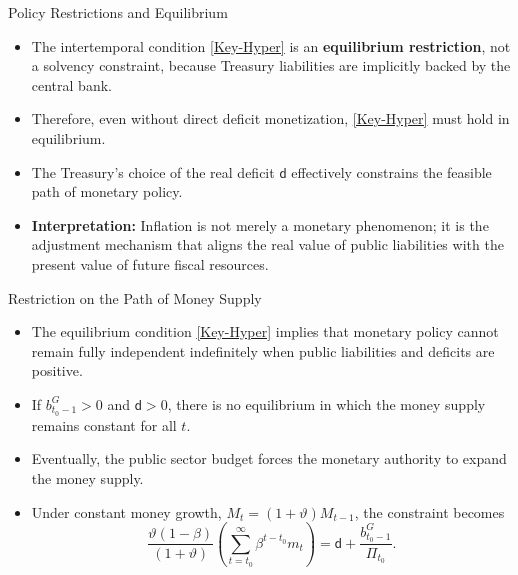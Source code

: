 \documentclass[11pt,aspectratio=169]{beamer}
\begin{document}
\begin{frame}{Policy Restrictions and Equilibrium}
\small
\begin{itemize}
    \item The intertemporal condition \eqref{Key-Hyper} is an \textbf{equilibrium restriction}, not a solvency constraint, because Treasury liabilities are implicitly backed by the central bank.
    \item Therefore, even without direct deficit monetization, \eqref{Key-Hyper} must hold in equilibrium.
    \item The Treasury’s choice of the real deficit \(\mathsf{d}\) effectively constrains the feasible path of monetary policy.
    \item \textbf{Interpretation:} Inflation is not merely a monetary phenomenon; it is the adjustment mechanism that aligns the real value of public liabilities with the present value of future fiscal resources.
\end{itemize}
\end{frame}


\begin{frame}{Restriction on the Path of Money Supply}
\small
\begin{itemize}
    \item The equilibrium condition \eqref{Key-Hyper} implies that monetary policy cannot remain fully independent indefinitely when public liabilities and deficits are positive.
    \item If \(b_{t_{0}-1}^{G}>0\) and \(\mathsf{d}>0\), there is no equilibrium in which the money supply remains constant for all \(t\).
    \item Eventually, the public sector budget forces the monetary authority to expand the money supply.
    \item Under constant money growth, \(M_{t}=(1+\vartheta)M_{t-1}\), the constraint becomes
    \begin{equation}
    \frac{\vartheta (1-\beta )}{(1+\vartheta )}\left( \sum_{t=t_{0}}^{\infty}\beta ^{t-t_{0}}m_{t}\right)
    =\mathsf{d}+\frac{b_{t_{0}-1}^{G}}{\Pi _{t_{0}}}.
    \label{Key-Hyper2}
    \end{equation}
\end{itemize}
\end{frame}
\end{document}
